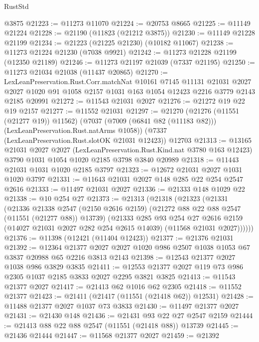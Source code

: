 \begin{lexlean}{RustStd}
\begin{coremodule}
    @3875
@21223 := @11273 @11070
@21224 := @20753 @8665
@21225 := @11149 @21224
@21228 := @21190 (@11823 (@21212 @3875))
@21230 := @11149 @21228 @21199
@21234 := @21223 (@21225 @21230) (@10182 @11067)
@21238 := @11273 @21224 @21230 (@7038 @9921)
@21242 := @11273 @21228 @21199 (@12350 @21189)
@21246 := @11273 @21197 @21039 (@7337 @21195)
@21250 := @11273 @21034 @21038 (@11437 @20865)
@21270 := LexLeanPreservation.Rust.Corr.matchNat
    @10161
    @7145
    @11131
    @21031
    @2027
    @2027
    @1020
    @91
    @1058
    @2157
    @1031
    @163
    @1054
    @12423
    @2216
    @3779
    @2143
    @2185
    @20991
@21272 := @11543 @21031 @2027
@21276 := @21272 @19 @22 @19 @2157
@21277 := @11552 @21031
@21297 := @21270
    (@21276 (@11551 (@21277 @19)) @11562)
    (@7037 (@7009 (@6841 @82 (@11183 @82))) (LexLeanPreservation.Rust.natArms @1058))
    (@7337 (LexLeanPreservation.Rust.slotOK @21031 @12423))
    @12703
@21313 := @13165
    @21031
    @2027
    @2027
    (LexLeanPreservation.Rust.Kind.nat @3780 @163 @12423)
    @3790
    @1031
    @1054
    @1020
    @2185
    @3798
    @3840
    @20989
@21318 := @11443 @21031 @1031 @1020 @2185 @3797
@21323 := @12672 @21031 @2027 @1031 @1020 @3797
@21331 := @11643 @21031 @2027 @148 @285 @22 @254 @2547 @2616
@21333 := @11497 @21031 @2027
@21336 := @21333 @148 @1029 @22
@21338 := @10 @254 @27
@21373 := @21313
    (@21318
      (@21323
        (@21331
          (@21336
            @21338
            @2547
            (@2150 @2616 @2159)
            (@21272 @88 @22 @88 @2547 (@11551 (@21277 @88)) @13739)
            (@21333
              @285
              @93
              @254
              @27
              @2616
              @2159
              (@14027 @21031 @2027 @282 @254 @2615 @14039)
              (@11568 @21031 @2027))))))
@21376 := @11398 (@12421 (@11404 @12423))
@21377 := @21376 @21031
@21392 := @12364
    @21377
    @2027
    @2027
    @1020
    @986
    @2507
    @1038
    @1053
    @67
    @3837
    @20988
    @65
    @2216
    @3813
    @2143
@21398 := @12543 @21377 @2027 @1038 @986 @3829 @3835
@21411 := @12553 @21377 @2027 @119 @73 @986 @2305 @1037 @2185 @3833 @2027 @2295 @3821 @3825
@21413 := @11543 @21377 @2027
@21417 := @21413 @62 @1016 @62 @2305
@21418 := @11552 @21377
@21423 := @21411 (@21417 (@11551 (@21418 @62)) @12531)
@21428 := @11488 @21377 @2027 @1037 @73 @3833
@21430 := @11497 @21377 @2027
@21431 := @21430 @148
@21436 := @21431 @93 @22 @27 @2547 @2159
@21444 := @21413 @88 @22 @88 @2547 (@11551 (@21418 @88)) @13739
@21445 := @21436 @21444
@21447 := @11568 @21377 @2027
@21459 := @21392

\end{coremodule}
\end{lexlean}
